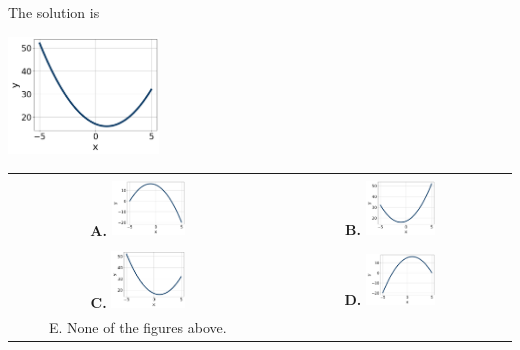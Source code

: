 \documentclass{extbook}[14pt]
\begin{document}
 
 The solution is  
 \begin{center} \includegraphics[width=0.3\textwidth]{../Figures/quadraticEquationToGraphCC.png} \end{center}\begin{tabular}{|c|c|} 
\hline 
 & \tabularnewline 
 \textbf{A.} \includegraphics[width=0.3\textwidth]{../Figures/quadraticEquationToGraphAC.png} & \textbf{B.} \includegraphics[width=0.3\textwidth]{../Figures/quadraticEquationToGraphBC.png} \tabularnewline 
\hline 
 & \tabularnewline 
 \textbf{C.} \includegraphics[width=0.3\textwidth]{../Figures/quadraticEquationToGraphCC.png} & \textbf{D.} \includegraphics[width=0.3\textwidth]{../Figures/quadraticEquationToGraphDC.png} \tabularnewline 
\hline 
 E. None of the figures above. & \tabularnewline 
\hline 
 \end{tabular} 
 
\end{document}
